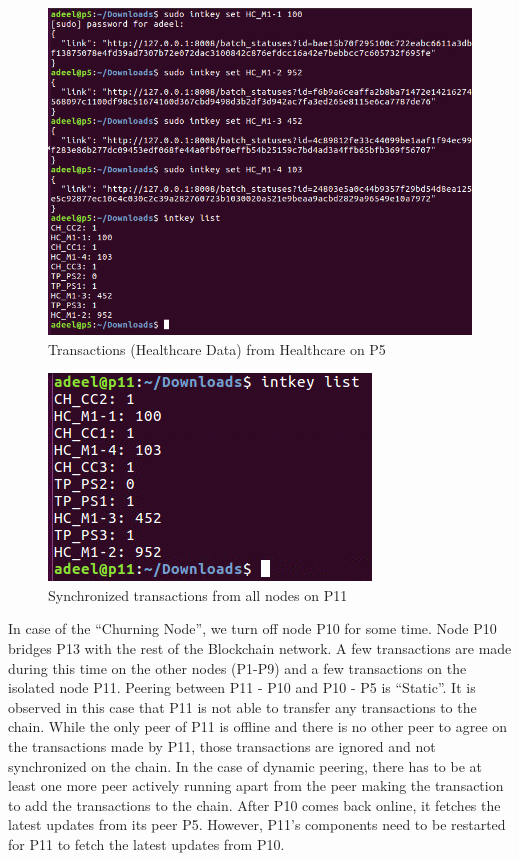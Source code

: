 \begin{figure}[H] %
    \centering
    \includegraphics[scale=.50]{figs/3HC_Trans.PNG}
    \setlength{\belowcaptionskip}{-15pt}
    \caption{Transactions (Healthcare Data) from Healthcare on P5}
    \label{fig:p2} %
\end{figure}

\begin{figure}[H] %
    \centering
    \includegraphics[scale=0.8]{figs/4P11_Trans.PNG}
    \setlength{\belowcaptionskip}{-5pt}
    \caption{Synchronized transactions from all nodes on P11}
    \label{fig:p3} %
\end{figure}

In case of the “Churning Node”, we turn off node P10 for some time. Node P10 bridges P13 with the rest of the Blockchain network. A few transactions are made during this time on the other nodes (P1-P9) and a few transactions on the isolated node P11. Peering between P11 - P10 and P10 - P5 is ``Static''. It is observed in this case that P11 is not able to transfer any transactions to the chain. While the only peer of P11 is offline and there is no other peer to agree on the transactions made by P11, those transactions are ignored and not synchronized on the chain. In the case of dynamic peering, there has to be at least one more peer actively running apart from the peer making the transaction to add the transactions to the chain. After P10 comes back online, it fetches the latest updates from its peer P5. However, P11's components need to be restarted for P11 to fetch the latest updates from P10. 

